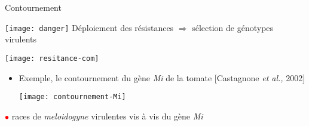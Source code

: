 




\begin{frame}{Contournement}

\medskip
%
%
		\texttt{[image: danger]}
	Déploiement des résistances $\Rightarrow$ sélection de génotypes
	virulents 
	\vfill
\begin{center}
		\texttt{[image: resitance-com]}
\end{center}
	\vfill
	            \begin{itemize}[itemsep=10pt]
\item Exemple, le contournement du gène \textit{Mi} de la tomate \textcolor{shadecolor}{\small[Castagnone \textit{et al.,} 2002]}
\begin{center}
		\texttt{[image: contournement-Mi]}
\end{center}
          \end{itemize}
 \centering
 {\large \textcolor{red}{$\bullet$}} races de  \textit{meloidogyne} virulentes vis à vis du gène \textit{Mi}
\end{frame}


